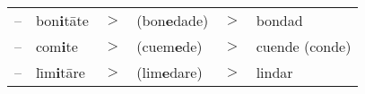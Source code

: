 \documentclass[convert={density=300,size=1080x800,outext=.png}]{standalone}
\begin{document}
\begin{tabular}{llclcl}
-- & bon\textbf{i}t\={a}te & $>$ & (bon\textbf{e}dade) & $>$ & bondad \\
-- & com\textbf{i}te & $>$ & (cuem\textbf{e}de) & $>$ & cuende (conde) \\
-- & l\={\i}m\textbf{i}t\={a}re & $>$ & (lim\textbf{e}dare) & $>$ & lindar\\
\end{tabular}
\end{document}

